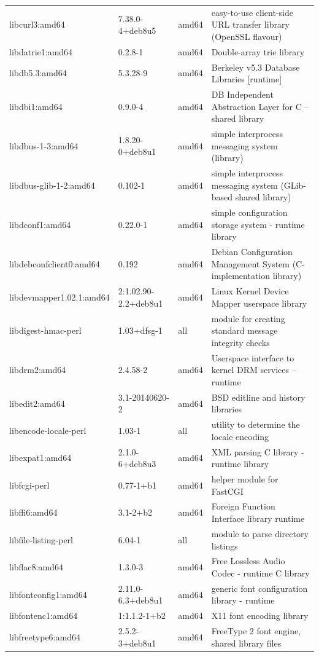 \documentclass[a4paper,10pt]{article}
\begin{document}
\begin{appendices}
{\begin{longtable}{p{3.25cm}@{\hspace{0.25cm}}p{4cm}@{\hspace{0.25cm}}l@{\hspace{0.25cm}}p{7cm}}
libcurl3:amd64	&	7.38.0-4+deb8u5	&	amd64	&	easy-to-use client-side URL transfer library (OpenSSL flavour)	\\
libdatrie1:amd64	&	0.2.8-1	&	amd64	&	Double-array trie library	\\
libdb5.3:amd64	&	5.3.28-9	&	amd64	&	Berkeley v5.3 Database Libraries [runtime]	\\
libdbi1:amd64	&	0.9.0-4	&	amd64	&	DB Independent Abstraction Layer for C -- shared library	\\
libdbus-1-3:amd64	&	1.8.20-0+deb8u1	&	amd64	&	simple interprocess messaging system (library)	\\
libdbus-glib-1-2:amd64	&	0.102-1	&	amd64	&	simple interprocess messaging system (GLib-based shared library)	\\
libdconf1:amd64	&	0.22.0-1	&	amd64	&	simple configuration storage system - runtime library	\\
libdebconfclient0:amd64	&	0.192	&	amd64	&	Debian Configuration Management System (C-implementation library)	\\
libdevmapper1.02.1:amd64	&	2:1.02.90-2.2+deb8u1	&	amd64	&	Linux Kernel Device Mapper userspace library	\\
libdigest-hmac-perl	&	1.03+dfsg-1	&	all	&	module for creating standard message integrity checks	\\
libdrm2:amd64	&	2.4.58-2	&	amd64	&	Userspace interface to kernel DRM services -- runtime	\\
libedit2:amd64	&	3.1-20140620-2	&	amd64	&	BSD editline and history libraries	\\
libencode-locale-perl	&	1.03-1	&	all	&	utility to determine the locale encoding	\\
libexpat1:amd64	&	2.1.0-6+deb8u3	&	amd64	&	XML parsing C library - runtime library	\\
libfcgi-perl	&	0.77-1+b1	&	amd64	&	helper module for FastCGI	\\
libffi6:amd64	&	3.1-2+b2	&	amd64	&	Foreign Function Interface library runtime	\\
libfile-listing-perl	&	6.04-1	&	all	&	module to parse directory listings	\\
libflac8:amd64	&	1.3.0-3	&	amd64	&	Free Lossless Audio Codec - runtime C library	\\
libfontconfig1:amd64	&	2.11.0-6.3+deb8u1	&	amd64	&	generic font configuration library - runtime	\\
libfontenc1:amd64	&	1:1.1.2-1+b2	&	amd64	&	X11 font encoding library	\\
libfreetype6:amd64	&	2.5.2-3+deb8u1	&	amd64	&	FreeType 2 font engine, shared library files	\\

\end{longtable}}
\end{appendices}
\end{document}
